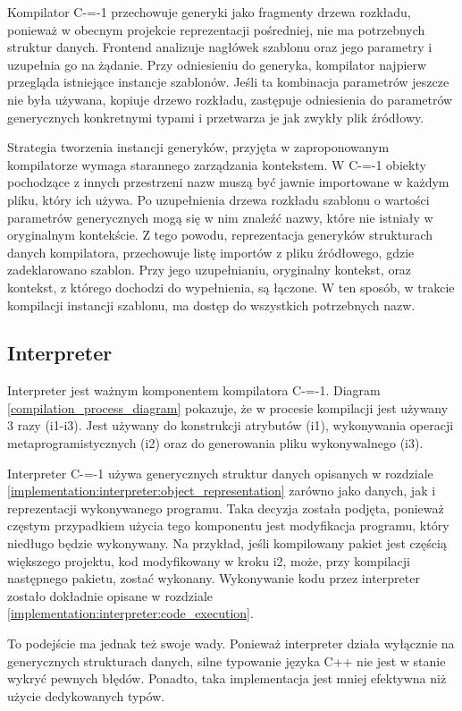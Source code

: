 Kompilator C-=-1 przechowuje generyki jako fragmenty drzewa rozkładu, ponieważ w obecnym projekcie reprezentacji pośredniej, nie ma potrzebnych struktur danych.
Frontend analizuje nagłówek szablonu oraz jego parametry i uzupełnia go na żądanie.
Przy odniesieniu do generyka, kompilator najpierw przegląda istniejące instancje szablonów.
Jeśli ta kombinacja parametrów jeszcze nie była używana, kopiuje drzewo rozkładu, zastępuje odniesienia do parametrów generycznych konkretnymi typami i przetwarza je jak zwykły plik źródłowy.

Strategia tworzenia instancji generyków, przyjęta w zaproponowanym kompilatorze wymaga starannego zarządzania kontekstem.
W C-=-1 obiekty pochodzące z innych przestrzeni nazw muszą być jawnie importowane w każdym pliku, który ich używa.
Po uzupełnienia drzewa rozkładu szablonu o wartości parametrów generycznych mogą się w nim znaleźć nazwy, które nie istniały w oryginalnym kontekście.
Z tego powodu, reprezentacja generyków strukturach danych kompilatora, przechowuje listę importów z pliku źródłowego, gdzie zadeklarowano szablon.
Przy jego uzupełnianiu, oryginalny kontekst, oraz kontekst, z którego dochodzi do wypełnienia, są łączone.
W ten sposób, w trakcie kompilacji instancji szablonu, ma dostęp do wszystkich potrzebnych nazw.

\subsection{Interpreter}
\label{interpreter}

Interpreter jest ważnym komponentem kompilatora C-=-1.
Diagram \ref{compilation_process_diagram} pokazuje, że w procesie kompilacji jest używany 3 razy (i1-i3).
Jest używany do konstrukcji atrybutów (i1), wykonywania operacji metaprogramistycznych (i2) oraz do generowania pliku wykonywalnego (i3).

Interpreter C-=-1 używa generycznych struktur danych opisanych w rozdziale \ref{implementation:interpreter:object_representation} zarówno jako danych, jak i reprezentacji wykonywanego programu.
Taka decyzja została podjęta, ponieważ częstym przypadkiem użycia tego komponentu jest modyfikacja programu, który niedługo będzie wykonywany.
Na przykład, jeśli kompilowany pakiet jest częścią większego projektu, kod modyfikowany w kroku i2, może, przy kompilacji następnego pakietu, zostać wykonany.
Wykonywanie kodu przez interpreter zostało dokładnie opisane w rozdziale \ref{implementation:interpreter:code_execution}.

To podejście ma jednak też swoje wady.
Ponieważ interpreter działa wyłącznie na generycznych strukturach danych, silne typowanie języka C++ nie jest w stanie wykryć pewnych błędów.
Ponadto, taka implementacja jest mniej efektywna niż użycie dedykowanych typów.

